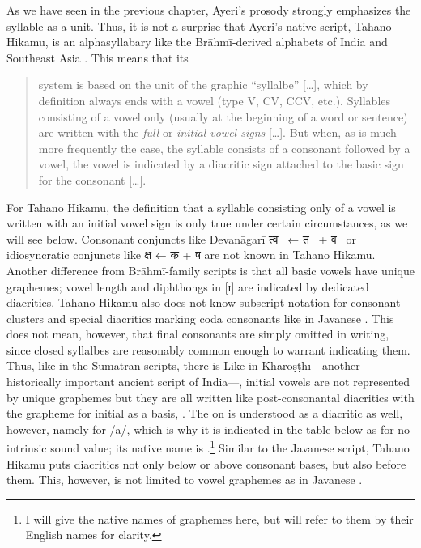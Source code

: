 As we have seen in the previous chapter, Ayeri's prosody strongly emphasizes 
the syllable as a unit. Thus, it is not a surprise that Ayeri's native script,
Tahano Hikamu, is an alphasyllabary like the Brāhmī-derived alphabets of India 
and Southeast Asia \parencites{salomon1996}{court1996}. 
This means that its 

\blockcquote[376]{salomon1996}{system is based on the unit of the graphic 
\enquote{syllalbe} […], which by definition always ends with a vowel (type V, 
CV, CCV, etc.). Syllables consisting of a vowel only (usually at the beginning 
of a word or sentence) are written with the \emph{full} or \emph{initial vowel 
signs} […]. But when, as is much more frequently the case, the syllable 
consists 
of a consonant followed by a vowel, the vowel is indicated by a diacritic sign 
attached to the basic sign for the consonant […].}

For Tahano Hikamu, the definition that a syllable consisting only of a vowel is 
written with an initial vowel sign is only true under certain circumstances, as 
we will see below. Consonant conjuncts like Devanāgarī {\FS त्व}~ ← 
{\FS त}~ + {\FS व}~ or idiosyncratic conjuncts like {\FS क्ष} 
 ← {\FS क}  + {\FS ष}  are not known in Tahano 
Hikamu. Another difference from Brāhmī-family scripts is that all basic vowels 
have unique graphemes; vowel length and diphthongs in [ɪ] are indicated by 
dedicated diacritics. Tahano Hikamu also does not know subscript notation for 
consonant clusters and special diacritics marking coda consonants like in 
Javanese \citep[478--479]{kuipersmcdermott1996}. This does not mean, however, 
that final consonants are simply omitted in writing, since closed syllalbes are 
reasonably common enough to warrant indicating them. Thus, like in the Sumatran 
scripts, there is  Like in Kharoṣṭhī---another historically important ancient script 
of India---, initial vowels are not represented by unique graphemes but they 
are all written like post-consonantal diacritics with the grapheme for initial 
 as a basis,  \citep[377]{salomon1996}. The  on 
 is understood as a diacritic as well, however, namely for /a/, which is 
why it is indicated in the table below as   for no intrinsic 
sound value; its native name is .\footnote{I will 
give the native names of graphemes here, but will refer to them by their 
English names for clarity.} Similar to the Javanese script, Tahano Hikamu puts 
diacritics not only below or above consonant bases, but also before them. This, 
however, is not limited to vowel graphemes as in Javanese 
\citep[478]{kuipersmcdermott1996}.

